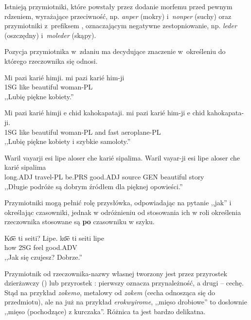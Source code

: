 \begin{spacing}{1.1}
Istnieją przymiotniki, które powstały przez dodanie morfemu  przed
pewnym rdzeniem, wyrażające przeciwność, np. \emph{anper}  (mokry)
i~\emph{nonper}  (suchy) oraz przymiotniki z~prefiksem ,
oznaczającym negatywne zestopniowanie, np. \emph{leder}  (oszczędny)
i~\emph{moleder}  (skąpy).

Pozycja przymiotnika w~zdaniu ma decydujące znaczenie w~określeniu do którego
rzeczownika się odnosi.

\begin{exe}
	\ex
	\trans Mi pazi karié himji.
	\gll mi pazi karié him-ji\\
	  1SG like beautiful woman-PL\\
	\glt  ,,Lubię piękne kobiety.''
\end{exe}

\begin{exe}
	\ex
	\trans Mi pazi karié himji e chid kahokapataji.
	\gll mi pazi karié him-ji e chid kahokapata-ji.\\
	  1SG like beautiful woman-PL and fast aeroplane-PL\\
	\glt  ,,Lubię piękne kobiety i szybkie samoloty.''
\end{exe}

\begin{exe}
	\ex
	\trans Waril vayarji esi lipe aloser che karié sipalima.
	\gll Waril vayar-ji esi lipe aloser che karié sipalima\\
	  long.ADJ travel-PL be.PRS good.ADJ source GEN beautiful story\\
	\glt  ,,Długie podróże są dobrym źródłem dla pięknej opowieści.''
\end{exe}

Przymiotniki mogą pełnić rolę przysłówka, odpowiadając na pytanie ,,jak'' i
określając czasowniki, jednak w odróżnieniu od stosowania ich w roli określenia
rzeczownika stosowane są \textbf{po} czasowniku w szyku.

\begin{exe}
	\ex
	\trans Ko͞e ti seiti? Lipe.
	\gll ko͞e ti seiti lipe\\
	  how 2SG feel good.ADV\\
	\glt  ,,Jak się czujesz? Dobrze.''
\end{exe}

Przymiotnik od rzeczownika-nazwy własnej tworzony jest przez przyrostek
dzierżawczy  () lub przyrostek : pierwszy oznacza
przynależność, a drugi -- cechę. Stąd na przykład \emph{zokemo}, metalowy od
\emph{zokem} (cecha odnosząca się do przedmiotu), ale na już na przykład
\emph{erokwyirome}, ,,mięso drobiowe'' to dosłownie ,,mięso (pochodzące) z
kurczaka''. Różnica ta jest bardzo delikatna.


\end{spacing}

